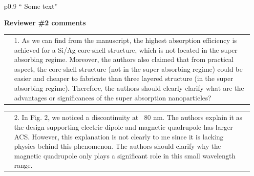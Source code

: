 \documentclass[a4paper]{article}
\begin{document}

\begin{tabular}[!H]{p{0.9\textwidth}}
`` Some text''
\end{tabular}


\vspace{10pt}

\begin{minipage}{1.0\linewidth}
  \textbf{Reviewer \#2 comments}\\
  \begin{tabular}[!H]{l|p{}}
    \quad & 1.  As we can find from the manuscript, the highest
    absorption efficiency is achieved for a Si/Ag core-shell
    structure, which is not located in the super absorbing
    regime. Moreover, the authors also claimed that from practical
    aspect, the core-shell structure (not in the super absorbing
    regime) could be easier and cheaper to fabricate than three
    layered structure (in the super absorbing regime). Therefore, the
    authors should clearly clarify what are the advantages or
    significances of the super absorption nanoparticles? 
\end{tabular}
\end{minipage}




\begin{tabular}[!H]{l|p{}}
  \quad &  2.      In Fig. 2, we noticed a discontinuity at ~80
  nm. The authors explain it as the design supporting electric dipole
  and magnetic quadrupole has larger ACS. However, this explanation is
  not clearly to me since it is lacking physics behind this
  phenomenon. The authors should clarify why the magnetic quadrupole
  only plays a significant role in this small wavelength range. 
\end{tabular}
\end{document}
